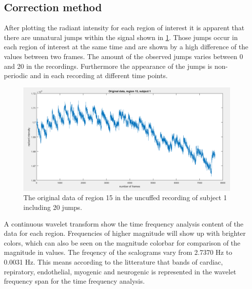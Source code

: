 \subsection{Correction method}

After plotting the radiant intensity for each region of interest it is apparent that there are unnatural jumps within the signal shown in \ref{fig:raw15}. Those jumps occur in each region of interest at the same time and are shown by a high difference of the values between two frames. The amount of the observed jumps varies between 0 and 20 in the recordings. Furthermore the appearance of the jumps is non-periodic and in each recording at different time points.
\begin{figure}[H]
	\includegraphics[width=1\textwidth]{figures/raw15}
	\caption{The original data of region 15 in the uncuffed recording of subject 1 including 20 jumps.}
	\label{fig:raw15}
\end{figure}
A continuous wavelet transform show the time frequency analysis content of the data for each region. Frequencies of higher magnitude will show up with brighter colors, which can also be seen on the magnitude colorbar for comparison of the magnitude in values. 
The freqency of the scalograms vary from 2.7370 Hz to 0.0031 Hz. This means according to the litterature that bands of cardiac, repiratory, endothelial, myogenic and neurogenic is represented in the wavelet frequency span for the time frequency analysis. \cite{sagaidachnyi2014}
